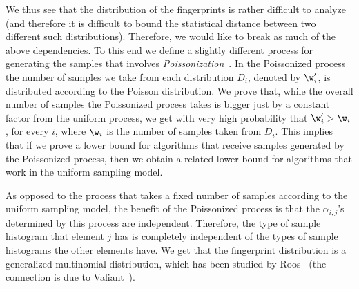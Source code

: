 %
%
We thus see that the distribution of the fingerprints is rather difficult to
analyze (and therefore it is difficult
 to bound the statistical distance between two different such distributions).
Therefore, we would like to break as much of the above dependencies.
To this end we %
define a slightly different process for generating
the samples that involves \emph{Poissonization}~\cite{szpankowski}.
In the Poissonized process the number of samples we take from each distribution $D_i$,
denoted by $\w'_i$, is distributed according to the Poisson distribution.
We prove that, while the overall number of samples the Poissonized process
takes is bigger just by a constant factor from the uniform process,
we get with very high probability that $\w'_i > \w_i$, for every $i$,
where $\w_i$ is the number of samples taken from $D_i$.
This implies that if we prove a lower bound for algorithms that receive
samples generated by the Poissonized process, then we obtain a related lower
bound for algorithms that work in the uniform sampling model.

As opposed to the process that takes a fixed number of samples according
to the uniform sampling model, the benefit of the Poissonized process is
that the $\alpha_{i,j}$'s determined by this process are independent.
Therefore, the type of sample histogram that element $j$ has is completely
independent of the types of sample histograms the other elements have.
We get that the fingerprint distribution is a generalized multinomial distribution,
which %
has been studied by Roos~\cite{roos}
(the connection is due to Valiant~\cite{val}).




%
%
%
%
%
%
%
%
%
%
%
%
%
%

